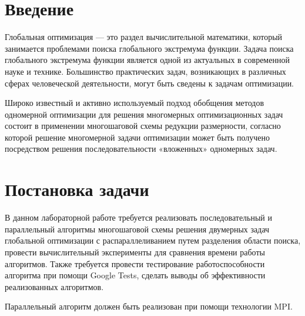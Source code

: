 \documentclass{report}
\begin{document}
\setcounter{page}{2}

\tableofcontents
\newpage

\section*{Введение}
\par Глобальная оптимизация — это раздел вычислительной математики, который занимается проблемами поиска глобального экстремума функции. Задача поиска глобального экстремума функции является одной из актуальных в современной науке и технике. Большинство практических задач, возникающих в различных сферах человеческой деятельности, могут быть сведены к задачам оптимизации.
\par Широко известный и активно используемый подход обобщения методов одномерной оптимизации для решения многомерных оптимизационных задач состоит в применении многошаговой схемы редукции размерности, согласно которой решение многомерной задачи оптимизации может быть получено посредством решения последовательности «вложенных» одномерных задач.

\newpage

\section*{Постановка задачи}
\par В данном лабораторной работе требуется реализовать последовательный и параллельный алгоритмы многошаговой схемы решения двумерных задач глобальной оптимизации с распараллеливанием путем разделения области поиска, провести вычислительный эксперименты для сравнения времени работы алгоритмов. Также требуется провести тестирование работоспособности алгоритма при помощи Google Tests, сделать выводы об эффективности реализованных алгоритмов.
\par Параллельный алгоритм должен быть реализован при помощи технологии MPI.

\newpage

\end{document}
